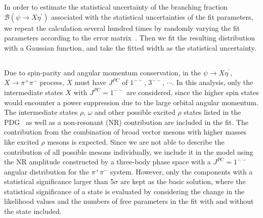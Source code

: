 \documentclass[twocolumn,showpacs,aps,prd]{revtex4-1}
\begin{document}
In order to estimate the statistical uncertainty of the branching fraction ${\mathcal B}(\psi \to X\eta^{\prime})$ associated with the statistical uncertainties of the fit parameters, we repeat the calculation several hundred times by randomly varying the fit parameters according to the error matrix~\cite{qzhzhao}. Then we fit the resulting distribution with a Gaussian function, and take the fitted width as the statistical uncertainty.




\subsection{}\label{pwajpsi}

Due to spin-parity and angular momentum conservation, in the $\psi \to X\eta^\prime$, $X\to \pi^+\pi^-$ process, $X$ must have
$J^{PC}$ of $1^{--}$, $3^{--}$, $\cdots$. In this analysis, only the intermediate states $X$ with $J^{PC} = 1^{--}$ are considered,
since the higher spin states would encounter a power suppression due to the large orbital angular momentum. The intermediate states $\rho$, $\omega$ and other possible excited $\rho$ states listed in the PDG~\cite{pdg} as well as
a non-resonant (NR) contribution are included in the fit. The contribution from the combination of broad vector mesons with higher masses like excited $\rho$ mesons is expected. Since we are not able to describe the contribution of all possible mesons individually, we include it in the model using the NR amplitude constructed by a three-body phase space with a $J^{PC} = 1^{--}$ angular distribution for the $\pi^{+}\pi^{-}$ system.
However, only the components with a statistical significance larger than 5$\sigma$ are kept
as the basic solution, where the statistical significance of a state is evaluated by considering the change in the likelihood values and the
numbers of free parameters in the fit with and without the state included.
\end{document}

